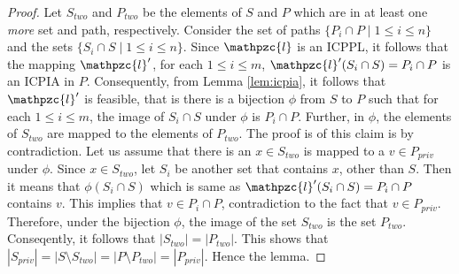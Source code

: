 \documentclass[envcountsect, envcountsame, 11pt]{../lib/llncs2e/llncs}
\def\cl{\mathpzc{l}}
\begin{document}
\begin{proof}
Let $S_{two}$ and $P_{two}$ be the elements of $S$ and $P$ which are in at least one {\em more} set and path, respectively.   Consider the set of paths $\{P_i \cap P \mid 1 \leq i \leq n\}$ and the sets $\{S_i \cap S \mid 1 \leq i \leq n\}$.  Since $\cl$ is an ICPPL, it follows that the mapping $\cl'$,  for each $1 \leq i \leq m$,  $\cl'(S_i \cap S) = P_i \cap P$ is
an ICPIA in $P$.     Consequently, from Lemma \ref{lem:icpia}, it follows that $\cl'$ is feasible, that is there is 
a bijection $\phi$ from $S$ to $P$ such that for each $1 \leq i \leq m$, the image of $S_i \cap S$ under $\phi$ is $P_i \cap P$.  Further, in $\phi$,
the elements of $S_{two}$ are mapped to the elements of $P_{two}$.  The proof is of this claim is by contradiction. Let us assume that there is an $x \in S_{two}$ is mapped to
a $v \in P_{priv}$ under $\phi$.  Since $x \in S_{two}$, let $S_i$ be another set that contains $x$, other than $S$.  Then it means that $\phi(S_i \cap S)$ which is same as $\cl'(S_i \cap S) =P_i \cap P$ contains $v$. This implies that $v \in P_i \cap P$, contradiction to the fact that $v \in P_{priv}$.  Therefore, under the bijection $\phi$, the image of the set $S_{two}$ is the set $P_{two}$.
Conseqently, it follows that $|S_{two}| = |P_{two}|$.  
 This shows that $|S_{priv}| = |S \setminus S_{two}| = |P \setminus P_{two}|=|P_{priv}|$.   Hence the lemma.
 \end{proof}
\end{document}
